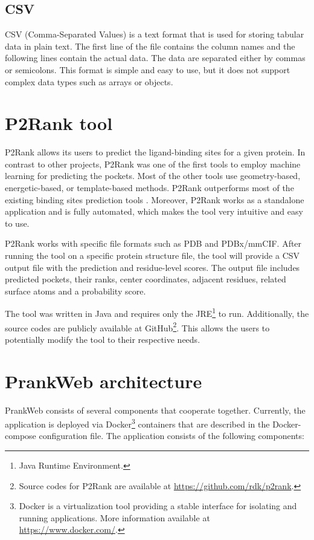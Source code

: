\subsection{CSV}
\label{subsec:CSV}

CSV (Comma-Separated Values) is a text format that is used for storing tabular data in plain text. The first line of the file contains the column names and the following lines contain the actual data. The data are separated either by commas or semicolons. This format is simple and easy to use, but it does not support complex data types such as arrays or objects.

\section{P2Rank tool}
\label{sec:p2rank}

P2Rank allows its users to predict the ligand-binding sites for a given protein. In contrast to other projects, P2Rank was one of the first tools to employ machine learning for predicting the pockets. Most of the other tools use geometry-based, energetic-based, or template-based methods. P2Rank outperforms most of the existing binding sites prediction tools \cite{krivak2018p2rank}. Moreover, P2Rank works as a standalone application and is fully automated, which makes the tool very intuitive and easy to use.

P2Rank works with specific file formats such as PDB and PDBx/mmCIF. After running the tool on a specific protein structure file, the tool will provide a CSV output file with the prediction and residue-level scores. The output file includes predicted pockets, their ranks, center coordinates, adjacent residues, related surface atoms and a probability score.

The tool was written in Java and requires only the JRE\footnote{Java Runtime Environment.} to run. Additionally, the source codes are publicly available at GitHub\footnote{Source codes for P2Rank are available at \url{https://github.com/rdk/p2rank}.}. This allows the users to potentially modify the tool to their respective needs. 

\section{PrankWeb architecture}
\label{sec:prankweb_arch}

PrankWeb consists of several components that cooperate together. Currently, the application is deployed via Docker\footnote{Docker is a virtualization tool providing a stable interface for isolating and running applications. More information available at \url{https://www.docker.com/}.} containers that are described in the Docker-compose configuration file. The application consists of the following components:

